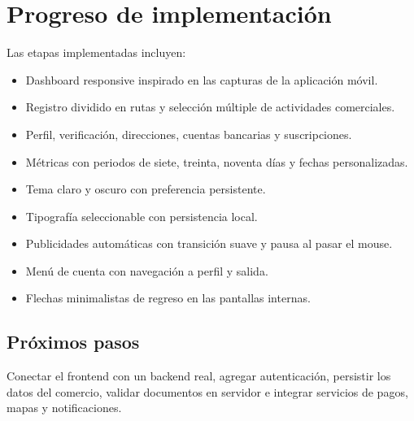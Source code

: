 \section{Progreso de implementación}

Las etapas implementadas incluyen:

\begin{itemize}[leftmargin=*]
  \item Dashboard responsive inspirado en las capturas de la aplicación móvil.
  \item Registro dividido en rutas y selección múltiple de actividades comerciales.
  \item Perfil, verificación, direcciones, cuentas bancarias y suscripciones.
  \item Métricas con periodos de siete, treinta, noventa días y fechas personalizadas.
  \item Tema claro y oscuro con preferencia persistente.
  \item Tipografía seleccionable con persistencia local.
  \item Publicidades automáticas con transición suave y pausa al pasar el mouse.
  \item Menú de cuenta con navegación a perfil y salida.
  \item Flechas minimalistas de regreso en las pantallas internas.
\end{itemize}

\subsection{Próximos pasos}

Conectar el frontend con un backend real, agregar autenticación, persistir los datos del comercio, validar documentos en servidor e integrar servicios de pagos, mapas y notificaciones.
